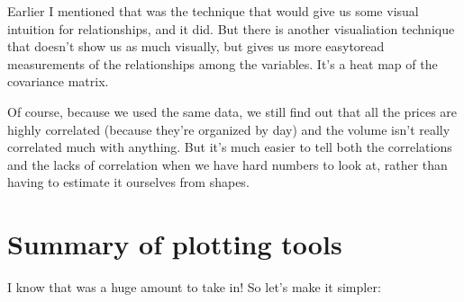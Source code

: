 \documentclass[letterpaper,10pt,english]{sphinxmanual}
\begin{document}
Earlier I mentioned that  was the technique that would give us some visual intuition for relationships, and it did.  But there is another visualiation technique that doesn’t show us as much visually, but gives us more easy\sphinxhyphen{}to\sphinxhyphen{}read measurements of the relationships among the variables.  It’s a heat map of the covariance matrix.

\begin{sphinxVerbatim}[commandchars=\\\{\}]
     
     
   
   
    
\end{sphinxVerbatim}

\noindent{}

Of course, because we used the same data, we still find out that all the prices are highly correlated (because they’re organized by day) and the volume isn’t really correlated much with anything.  But it’s much easier to tell both the correlations and the lacks of correlation when we have hard numbers to look at, rather than having to estimate it ourselves from shapes.


\section{Summary of plotting tools}
\label{\detokenize{chapter-10-visualization:summary-of-plotting-tools}}
I know that was a huge amount to take in!  So let’s make it simpler:
\end{document}
